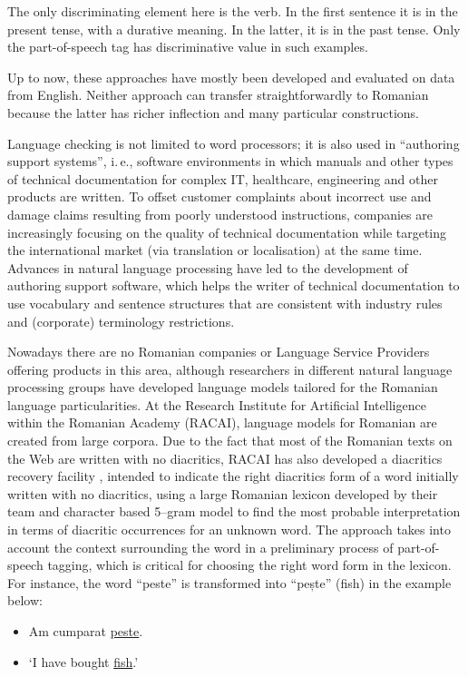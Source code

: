 \begin{multicols}{2}
The only discriminating element here is the verb. In the first sentence it is in the present tense, with a durative meaning. In the latter, it is in the past tense. Only the part-of-speech tag has discriminative value in such examples.

Up to now, these approaches have mostly been developed and evaluated on data from English. Neither approach can transfer straightforwardly to Romanian because the latter has richer inflection and many particular constructions.

Language checking is not limited to word processors; it is also used in “authoring support systems”, i.\,e., software environments in which manuals and other types of technical documentation for complex IT, healthcare, engineering and other products are written. To offset customer complaints about incorrect use and damage claims resulting from poorly understood instructions, companies are increasingly focusing on the quality of technical documentation while targeting the international market (via translation or localisation) at the same time. Advances in natural language processing have led to the development of authoring support software, which helps the writer of technical documentation to use vocabulary and sentence structures that are consistent with industry rules and (corporate) terminology restrictions.

Nowadays there are no Romanian companies or Language Service Providers offering products in this area, although researchers in different natural language processing groups have developed language models tailored for the Romanian language particularities. At the Research Institute for Artificial Intelligence within the Romanian Academy (RACAI), language models for Romanian are created from large corpora. Due to the fact that most of the Romanian texts on the Web are written with no diacritics, RACAI has also developed a diacritics recovery facility \cite{DIAC}, intended to indicate the right diacritics form of a word initially written with no diacritics, using a large Romanian lexicon developed by their team and character based 5--gram model to find the most probable interpretation in terms of diacritic occurrences for an unknown word. The approach takes into account the context surrounding the word in a preliminary process of part-of-speech tagging, which is critical for choosing the right word form in the lexicon. For instance, the word ``peste'' is transformed into ``pește'' (fish) in the example below:

\begin{example}
\begin{itemize}
\item []Am cumparat \underline{peste}.
\item []`I have bought \underline{fish}.'
\end{itemize}
\end{example}


\end{multicols}
